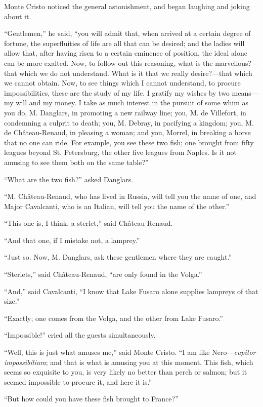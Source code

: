 Monte Cristo noticed the general astonishment, and began laughing and
joking about it.

“Gentlemen,” he said, “you will admit that, when arrived at a certain
degree of fortune, the superfluities of life are all that can be
desired; and the ladies will allow that, after having risen to a
certain eminence of position, the ideal alone can be more exalted. Now,
to follow out this reasoning, what is the marvellous?—that which we do
not understand. What is it that we really desire?—that which we cannot
obtain. Now, to see things which I cannot understand, to procure
impossibilities, these are the study of my life. I gratify my wishes by
two means—my will and my money. I take as much interest in the pursuit
of some whim as you do, M. Danglars, in promoting a new railway line;
you, M. de Villefort, in condemning a culprit to death; you, M. Debray,
in pacifying a kingdom; you, M. de Château-Renaud, in pleasing a woman;
and you, Morrel, in breaking a horse that no one can ride. For example,
you see these two fish; one brought from fifty leagues beyond St.
Petersburg, the other five leagues from Naples. Is it not amusing to
see them both on the same table?”

“What are the two fish?” asked Danglars.

“M. Château-Renaud, who has lived in Russia, will tell you the name of
one, and Major Cavalcanti, who is an Italian, will tell you the name of
the other.”

“This one is, I think, a sterlet,” said Château-Renaud.

“And that one, if I mistake not, a lamprey.”

“Just so. Now, M. Danglars, ask these gentlemen where they are caught.”

“Sterlets,” said Château-Renaud, “are only found in the Volga.”

“And,” said Cavalcanti, “I know that Lake Fusaro alone supplies
lampreys of that size.”

“Exactly; one comes from the Volga, and the other from Lake Fusaro.”

“Impossible!” cried all the guests simultaneously.

“Well, this is just what amuses me,” said Monte Cristo. “I am like
Nero—\textit{cupitor impossibilium}; and that is what is amusing you at this
moment. This fish, which seems so exquisite to you, is very likely no
better than perch or salmon; but it seemed impossible to procure it,
and here it is.”

“But how could you have these fish brought to France?”

